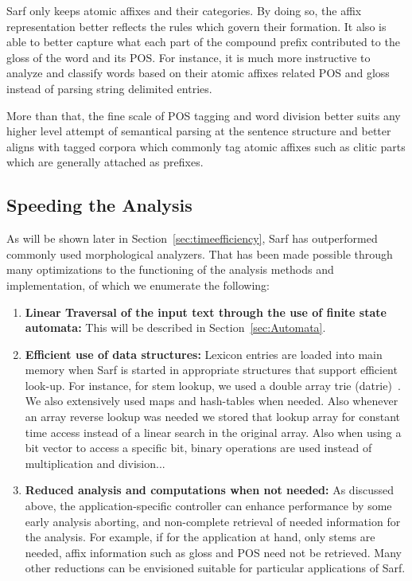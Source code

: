 \documentclass[a4,12pt]{report}
\begin{document}
Sarf only keeps atomic affixes and their categories.
By doing so, the affix representation better reflects the rules
which govern their formation. It also is able to better capture what each part of the compound prefix
contributed to the gloss of the word and its POS. For instance, it is much more instructive to analyze
and classify words based on their atomic affixes related POS and gloss instead of parsing string
delimited entries. 

More than that, the fine scale of POS tagging and word division better suits any higher level attempt of semantical
parsing at the sentence structure and better aligns with tagged corpora which commonly tag atomic affixes such as clitic 
parts which are generally attached as prefixes. 

\subsection{Speeding the Analysis} %

As will be shown later in Section~\ref{sec:timeefficiency}, Sarf has outperformed commonly used
morphological analyzers. That has been made possible through many optimizations to the functioning
of the analysis methods and implementation, of which we enumerate the following:

\begin{enumerate}
\item \textbf{Linear Traversal of the input text through the use of finite state automata:}
	This will be described in Section~\ref{sec:Automata}.
\item \textbf{Efficient use of data structures:} Lexicon entries are loaded into main memory 
	when Sarf is started in appropriate structures that support efficient look-up. For instance,
	for stem lookup, we used a double array trie (datrie)~\cite{Aoe:89}. We also extensively used
	maps and hash-tables when needed. Also whenever an array reverse lookup was needed we stored
	that lookup array for constant time access instead of a linear search in the original array.
	Also when using a bit vector to access a specific bit, binary operations are used instead of
	multiplication and division...
\item \textbf{Reduced analysis and computations when not needed:} As discussed above, the 
	application-specific controller can enhance performance by some early analysis aborting, and
	non-complete retrieval of needed information for the analysis. For example, if for the application 
	at hand, only stems are needed, affix information such as gloss and POS need not be retrieved.
	Many other reductions can be envisioned suitable for particular applications of Sarf. 
\end{enumerate}
\end{document}

